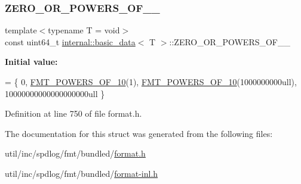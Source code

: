 \subsubsection{\texorpdfstring{Z\+E\+R\+O\+\_\+\+O\+R\+\_\+\+P\+O\+W\+E\+R\+S\+\_\+\+O\+F\+\_\+\_}{ZERO\_OR\_POWERS\_OF\_10\_64}}
{\footnotesize\ttfamily template$<$typename T  = void$>$ \\
const uint64\+\_\+t \hyperlink{structinternal_1_1basic__data}{internal\+::basic\+\_\+data}$<$ T $>$\+::Z\+E\+R\+O\+\_\+\+O\+R\+\_\+\+P\+O\+W\+E\+R\+S\+\_\+\+O\+F\+\_\+\_\hspace{0.3cm}{\ttfamily [static]}}

{\bfseries Initial value\+:}
\begin{DoxyCode}
= \{
  0,
  \hyperlink{format-inl_8h_aeff75c93a29bc942ca36b31a4b634fe9}{FMT\_POWERS\_OF\_10}(1),
  \hyperlink{format-inl_8h_aeff75c93a29bc942ca36b31a4b634fe9}{FMT\_POWERS\_OF\_10}(1000000000ull),
  10000000000000000000ull
\}
\end{DoxyCode}


Definition at line 750 of file format.\+h.



The documentation for this struct was generated from the following files\+:\begin{DoxyCompactItemize}
\item 
util/inc/spdlog/fmt/bundled/\hyperlink{format_8h}{format.\+h}\item 
util/inc/spdlog/fmt/bundled/\hyperlink{format-inl_8h}{format-\/inl.\+h}\end{DoxyCompactItemize}
